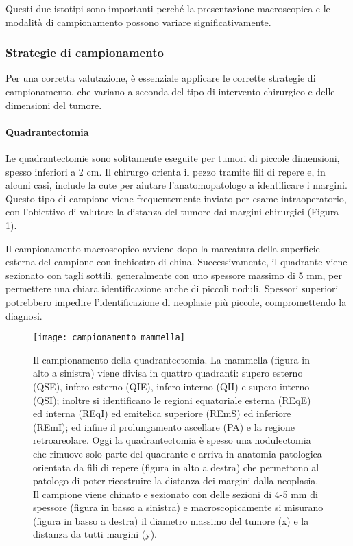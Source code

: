 Questi due istotipi sono importanti perché la presentazione macroscopica e le modalità di campionamento possono variare significativamente.

\subsubsection{Strategie di campionamento}
Per una corretta valutazione, è essenziale applicare le corrette strategie di campionamento, che variano a seconda del tipo di intervento chirurgico e delle dimensioni del tumore.

\paragraph{Quadrantectomia}
Le quadrantectomie sono solitamente eseguite per tumori di piccole dimensioni, spesso inferiori a 2 cm. Il chirurgo orienta il pezzo tramite fili di repere e, in alcuni casi, include la cute per aiutare l'anatomopatologo a identificare i margini. Questo tipo di campione viene frequentemente inviato per esame intraoperatorio, con l’obiettivo di valutare la distanza del tumore dai margini chirurgici (Figura \ref{fig:campionamento_mammella}).

Il campionamento macroscopico avviene dopo la marcatura della superficie esterna del campione con inchiostro di china. Successivamente, il quadrante viene sezionato con tagli sottili, generalmente con uno spessore massimo di 5 mm, per permettere una chiara identificazione anche di piccoli noduli. Spessori superiori potrebbero impedire l’identificazione di neoplasie più piccole, compromettendo la diagnosi.


\begin{figure}[p]
    \centering
    \texttt{[image: campionamento\_mammella]}
    \caption{Il campionamento della quadrantectomia.  La mammella (figura in alto a sinistra) viene divisa in quattro quadranti: supero esterno (QSE), infero esterno (QIE), infero interno (QII) e supero interno (QSI); inoltre si identificano le regioni equatoriale esterna (REqE) ed interna (REqI) ed emitelica superiore (REmS) ed inferiore (REmI); ed infine il prolungamento ascellare (PA) e la regione retroareolare. Oggi la quadrantectomia è spesso una nodulectomia che rimuove solo parte del quadrante e arriva in anatomia patologica orientata da fili di repere (figura in alto a destra) che permettono al patologo di poter ricostruire la distanza dei margini dalla neoplasia. Il campione viene chinato e sezionato con delle sezioni di 4-5 mm di spessore (figura in basso a sinistra) e macroscopicamente si misurano (figura in basso a destra) il diametro massimo del tumore (x) e la distanza da tutti margini (y).}
    \label{fig:campionamento_mammella}
\end{figure}

